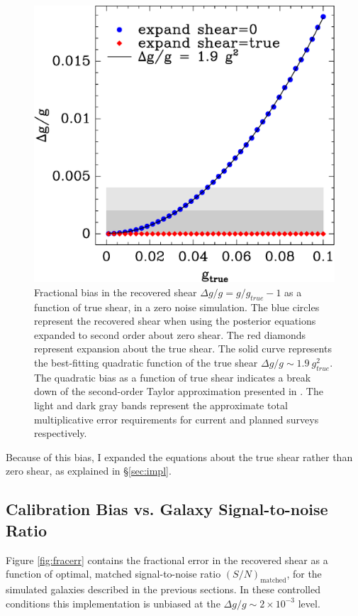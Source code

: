 \documentclass[usegraphicx,usenatbib]{mn2e}
\newcommand{\Msn}{$(S/N)_{\textrm{matched}}$}
\begin{document}
\begin{figure}
 \includegraphics[scale=0.45]{figures/fracerr-vs-shear.eps}
 \caption{Fractional bias in the recovered shear $\Delta g/g = g/g_{true}-1$
     as a function of true shear,
     in a zero noise simulation.  The blue circles represent the recovered
     shear when using the posterior equations expanded to second order about
     zero shear.  The red diamonds represent expansion about the true shear.
     The solid curve represents the best-fitting quadratic function of the true
     shear $\Delta g/g \sim 1.9~g^2_{true}$.  The quadratic bias as a function of
     true shear indicates a break down of the second-order Taylor approximation
 presented in \citet{ba14}. The light and dark gray bands represent the
 approximate total multiplicative error requirements for current and planned surveys respectively.}
 \label{fig:nonoise}
\end{figure}

Because of this bias, I expanded the equations about the true shear rather than
zero shear, as explained in \S \ref{sec:impl}.

\subsection{Calibration Bias vs. Galaxy Signal-to-noise Ratio} \label{sec:snbias}

Figure \ref{fig:fracerr} contains the fractional error in the recovered shear
as a function of optimal, matched signal-to-noise ratio \Msn, for the simulated
galaxies described in the previous sections.  In these controlled conditions
this implementation is unbiased at the $\Delta g/g \sim 2\times 10^{-3}$ level.
\end{document}
